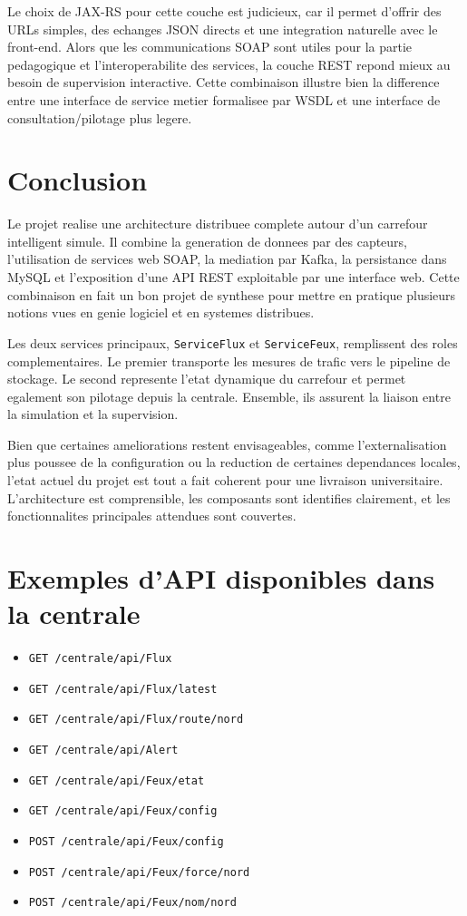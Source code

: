 \documentclass[12pt,a4paper]{report}
\begin{document}
Le choix de JAX-RS pour cette couche est judicieux, car il permet d'offrir des URLs simples, des echanges JSON directs et une integration naturelle avec le front-end. Alors que les communications SOAP sont utiles pour la partie pedagogique et l'interoperabilite des services, la couche REST repond mieux au besoin de supervision interactive. Cette combinaison illustre bien la difference entre une interface de service metier formalisee par WSDL et une interface de consultation/pilotage plus legere.

\chapter{Conclusion}
Le projet realise une architecture distribuee complete autour d'un carrefour intelligent simule. Il combine la generation de donnees par des capteurs, l'utilisation de services web SOAP, la mediation par Kafka, la persistance dans MySQL et l'exposition d'une API REST exploitable par une interface web. Cette combinaison en fait un bon projet de synthese pour mettre en pratique plusieurs notions vues en genie logiciel et en systemes distribues.

Les deux services principaux, \texttt{ServiceFlux} et \texttt{ServiceFeux}, remplissent des roles complementaires. Le premier transporte les mesures de trafic vers le pipeline de stockage. Le second represente l'etat dynamique du carrefour et permet egalement son pilotage depuis la centrale. Ensemble, ils assurent la liaison entre la simulation et la supervision.

Bien que certaines ameliorations restent envisageables, comme l'externalisation plus poussee de la configuration ou la reduction de certaines dependances locales, l'etat actuel du projet est tout a fait coherent pour une livraison universitaire. L'architecture est comprensible, les composants sont identifies clairement, et les fonctionnalites principales attendues sont couvertes.

\appendix
\chapter{Exemples d'API disponibles dans la centrale}
\begin{itemize}
    \item \texttt{GET /centrale/api/Flux}
    \item \texttt{GET /centrale/api/Flux/latest}
    \item \texttt{GET /centrale/api/Flux/route/nord}
    \item \texttt{GET /centrale/api/Alert}
    \item \texttt{GET /centrale/api/Feux/etat}
    \item \texttt{GET /centrale/api/Feux/config}
    \item \texttt{POST /centrale/api/Feux/config}
    \item \texttt{POST /centrale/api/Feux/force/nord}
    \item \texttt{POST /centrale/api/Feux/nom/nord}
\end{itemize}
\end{document}

